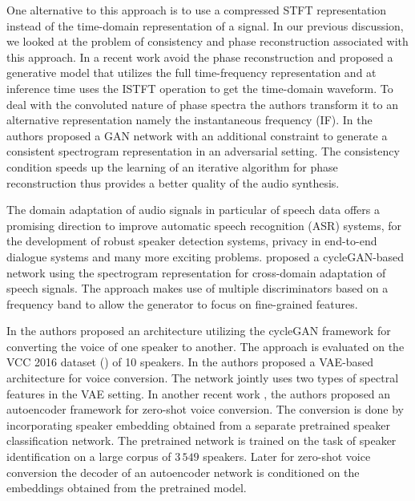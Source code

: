 One alternative to this approach is to use a compressed STFT representation instead of the time-domain representation of a signal. In our previous discussion, we looked at the problem of consistency and phase reconstruction associated with this approach. In a recent work \citet{engel2019gansynth} avoid the phase reconstruction and proposed a generative model that utilizes the full time-frequency representation and at inference time uses the ISTFT operation to get the time-domain waveform. To deal with the convoluted nature of phase spectra the authors transform it to an alternative representation namely the instantaneous frequency (IF). In \cite{marafiotiadversarial} the authors proposed a GAN network with an additional constraint to generate a consistent spectrogram representation in an adversarial setting. The consistency condition speeds up the learning of an iterative algorithm for phase reconstruction thus provides a better quality of the audio synthesis.

The domain adaptation of audio signals in particular of speech data offers a promising direction to improve automatic speech recognition (ASR) systems, for the development of robust speaker detection systems, privacy in end-to-end dialogue systems and many more exciting problems. \citet{hosseini2018multi} proposed a cycleGAN-based network using the spectrogram representation for cross-domain adaptation of speech signals. The approach makes use of multiple discriminators based on a frequency band to allow the generator to focus on fine-grained features.

In \citet{kaneko2017parallel} the authors proposed an architecture utilizing the cycleGAN framework for converting the voice of one speaker to another. The approach is evaluated on the VCC 2016 dataset (\cite{nakashika2016non}) of 10 speakers. In \citet{huang2018voice} the authors proposed a VAE-based architecture for voice conversion. The network jointly uses two types of spectral features in the VAE setting.
In another recent work \citet{qian2019autovc}, the authors proposed an autoencoder framework for zero-shot voice conversion. The conversion is done by incorporating speaker embedding obtained from a separate pretrained speaker classification network. The pretrained network is trained on the task of speaker identification on a large corpus of $3\,549$ speakers. Later for zero-shot voice conversion the decoder of an autoencoder network is conditioned on the embeddings obtained from the pretrained model.